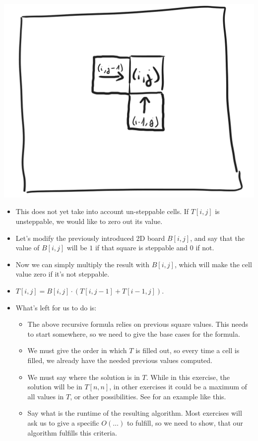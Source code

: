 \begin{center}
\includegraphics[width=\linewidth]{10/05/chess_recursive.png}
\end{center}

\begin{itemize}
    \item This does not yet take into account un-steppable cells. If $T[i,j]$ is unsteppable, we would like to zero out its value.
    \item Let's modify the previously introduced 2D board $B[i,j]$, and say that the value of $B[i,j]$ will be $1$ if that square is steppable and $0$ if not.
    \item Now we can simply multiply the result with $B[i,j]$, which will make the cell value zero if it's not steppable.
    \item $T[i,j] = B[i, j] \cdot{} (T[i, j-1] + T[i-1, j])$.
    \item What's left for us to do is:
    \begin{itemize}
        \item The above recursive formula relies on previous square values. This needs to start somewhere, so we need to give the base cases for the formula.
        \item We must give the order in which $T$ is filled out, so every time a cell is filled, we already have the needed previous values computed.
        \item We must say where the solution is in $T$. While in this exercise, the solution will be in $T[n,n]$, in other exercises it could be a maximum of all values in $T$, or other possibilities. See  for an example like this.
        \item Say what is the runtime of the resulting algorithm. Most exercises will ask us to give a specific $O(\dots{})$ to fulfill, so we need to show, that our algorithm fulfills this criteria.
    \end{itemize}
\end{itemize}

